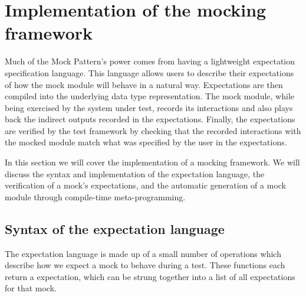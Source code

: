 \section{Implementation of the mocking framework}
\label{application:implementation}


Much of the Mock Pattern's power comes from having a lightweight
expectation specification language. This language allows users to
describe their expectations of how the mock module will behave in a
natural way. Expectations are then compiled into the underlying data
type representation. The mock module, while being exercised by the
system under test, records its interactions and also plays back the
indirect outputs recorded in the expectations. Finally, the
expectations are verified by the test framework by checking that the
recorded interactions with the mocked module match what was specified
by the user in the expectations.

In this section we will cover the implementation of a mocking
framework. We will discuss the syntax and implementation of the
expectation language, the verification of a mock's expectations, and
the automatic generation of a mock module through compile-time
meta-programming.

\subsection{Syntax of the expectation language}
\label{application:syntax}

The expectation language is made up of a small number of operations
which describe how we expect a mock to behave during a test. These
functions each return a expectation, which can be strung together into
a list of all expectations for that mock.

